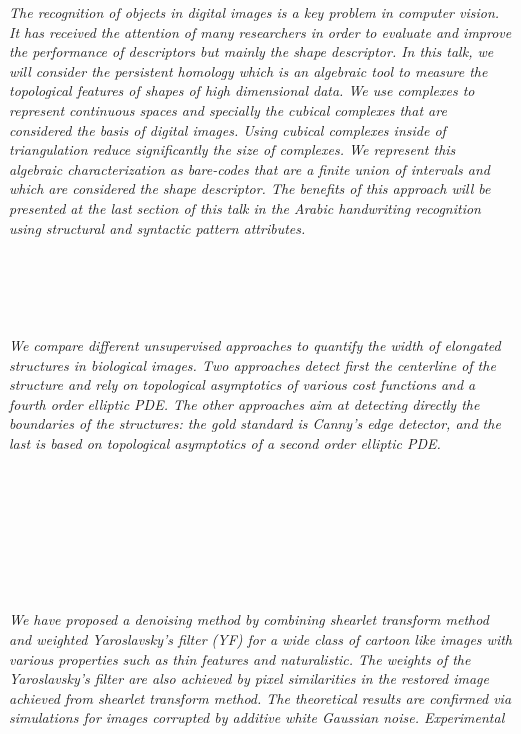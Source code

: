  \begin{multicols}{2}
    \textit{The recognition of objects in digital images is a  key problem  in computer vision. It has received the attention of many researchers  in order to evaluate and improve the performance of descriptors but mainly the shape descriptor.
		In this talk, we will consider the persistent homology which is an algebraic tool to measure the topological features of shapes of high dimensional data. We use complexes to represent continuous spaces and specially the cubical complexes that are considered the basis of digital images. Using cubical complexes inside of triangulation  reduce significantly the size of complexes. We represent this algebraic characterization as bare-codes that are a finite union of intervals and which are considered the shape descriptor. The benefits of this approach will be presented at the last section of this talk in the Arabic handwriting recognition using structural and syntactic pattern attributes.}\\
\\ 
      \\
      \\\\
\\
    \textit{We compare different unsupervised approaches to quantify the width of elongated structures in biological images. Two approaches detect first the centerline of the structure and rely on topological asymptotics of various cost functions and a fourth order elliptic PDE. The other approaches aim at detecting directly the boundaries of the structures: the gold standard is Canny's edge detector, and the last is based on topological asymptotics of a second order elliptic PDE.}\\
\\ 
      \\
      \\\\
      \\
      \\\\
\\
    \textit{We have proposed a denoising method by combining shearlet transform method  and  weighted  Yaroslavsky’s  filter  (YF)  for  a  wide  class  of  cartoon  like images with various properties such as thin features and naturalistic. The weights of the Yaroslavsky’s filter are also achieved by pixel similarities in the restored image achieved from shearlet transform method. The theoretical results are confirmed via simulations for images corrupted by additive white Gaussian noise. Experimental 
}
\end{multicols}

